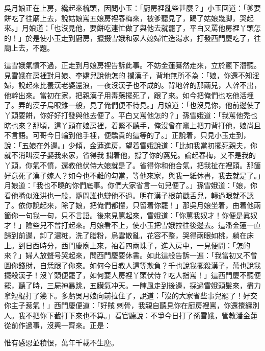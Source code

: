 吳月娘正在上房，纔起來梳頭，因問小玉：「廚房裡亂些甚麼？」小玉回道：「爹要餅吃了往廟上去，說姑娘罵五娘房裡春梅來，被爹聽見了，踢了姑娘幾脚，哭起來。」月娘道：「也沒見他，要餅吃連忙做了與他去就罷了，平白又罵他房裡丫頭怎的！」於是使小玉走到廚房，攛掇雪娥和家人媳婦忙造湯水，打發西門慶吃了，往廟上去，不題。

這雪娥氣憤不過，正走到月娘房裡告訴此事。不妨金蓮驀然走來，立於窻下潛聽。見雪娥在房裡對月娘、李嬌兒說他怎的𢺞攔漢子，背地無所不為：「娘，你還不知淫婦，說起來比養漢老婆還浪，一夜沒漢子也不成的。背地幹的那繭兒，人幹不出，他幹出來。{}當初在家，把親漢子用毒藥擺死了，跟了來。如今把俺們也吃他活埋了。弄的漢子烏眼雞一般，見了俺們便不待見。」月娘道：「也沒見你，他前邊使了丫頭要餅，你好好打發與他去便了。平白又罵他怎的？」孫雪娥道：「我罵他禿也瞎也來？那頃，這丫頭在娘房裡，着緊不聽手，俺沒曾在竈上把刀背打他，{}娘尚且不言語。可哥今日輪到他手裡，便驕貴的這等的了。」正說着，只見小玉走到，說：「五娘在外邊。」{}少傾，金蓮進房，望着雪娥說道：「比如我當初擺死親夫，你就不消叫漢子娶我來家，省得我𢺞攔着他，撐了你的窩兒。{}論起春梅，又不是我的丫頭，你氣不憤，還教他伏侍大娘就是了。省得你和他合氣，把我扯在裡頭。那箇好意死了漢子嫁人？{}如今也不難的勾當，等他來家，與我一紙休書，我去就是了。」月娘道：「我也不曉的你們底事。你們大家省言一句兒便了。」孫雪娥道：「娘，你看他嘴似淮洪也一般，隨問誰也辯他不過。{}明在漢子根前戳舌兒，轉過眼就不認了。依你說起來，除了娘，把俺們都攆，只留着你罷！」那吳月娘坐着，由着他兩箇你一句我一句，只不言語。後來見罵起來，雪娥道：「你罵我奴才！你便是眞奴才！」險些兒不曾打起來。月娘看不上，使小玉把雪娥拉往後邊去。這潘金蓮一直歸到前邊，卸了濃粧，洗了脂粉，烏雲散亂，花容不整，哭得兩眼如桃，躺在床上。{}到日西時分，西門慶廟上來，袖着四兩珠子，進入房中，一見便問：「怎的來？」婦人放聲号哭起來，問西門慶要休書。如此這般告訴一遍：「我當初又不曾圖你錢財，自恁跟了你來。如何今日教人這等欺負？千也說我擺殺漢子，萬也說我擺殺漢子！沒丫頭便罷了，如何要人房裡丫頭伏侍？吃人指罵！」這西門慶不聽便罷，聽了時，三屍神暴跳，五臟氣冲天。一陣風走到後邊，採過雪娥頭髮來，盡力{}拿短棍打了幾下。多虧吳月娘向前拉住了，說道：「沒的大家省些事兒罷了！{}好交你主子惹氣！」西門慶便道：「好賊𢱉剌骨，我親自聽見你在廚房裡罵，你還攪纏別人。我不把你下截打下來也不算。」看官聽說：不爭今日打了孫雪娥，管教潘金蓮從前作過事，沒興一齊來。正是：

\begin{myquote}
惟有感恩並積恨，萬年千載不生塵。
\end{myquote}

